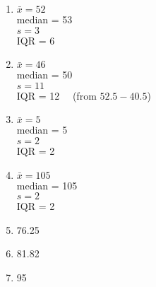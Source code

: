 \documentclass[12pt,letterpaper]{article}
\begin{document}
\newpage
\begin{multicols}{2}
\begin{enumerate}
\item $\bar{x} = 52$\\
median = 53\\
$s=3$\\
IQR = 6

\item $\bar{x} = 46$\\
median = 50\\
$s=11$\\
IQR = 12~~ (from $52.5-40.5$)

\item $\bar{x} = 5$\\
median = 5\\
$s=2$\\
IQR = 2

\columnbreak
\item $\bar{x} = 105$\\
median = 105\\
$s=2$\\
IQR = 2
\item 76.25
\item 81.82
\item 95
\end{enumerate}
\end{multicols}
\end{document}
